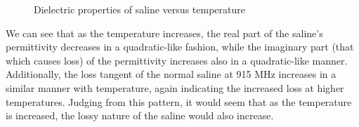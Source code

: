 \documentclass[12pt,onecolumn,titlepage]{article}
\begin{document}
\begin{figure}[htbp]
	\centering
		\quad
		\quad
		\quad
	\label{fig:saline_dielectric_v_temp}
	\caption{Dielectric properties of saline versus temperature}
\end{figure}


We can see that as the temperature increases, the real part of the saline's permittivity decreases in a quadratic-like fashion, while the imaginary part (that which causes loss) of the permittivity increases also in a quadratic-like manner. Additionally, the loss tangent of the normal saline at 915 MHz increases in a similar manner with temperature, again indicating the increased loss at higher temperatures. Judging from this pattern, it would seem that as the temperature is increased, the lossy nature of the saline would also increase.
\end{document}
